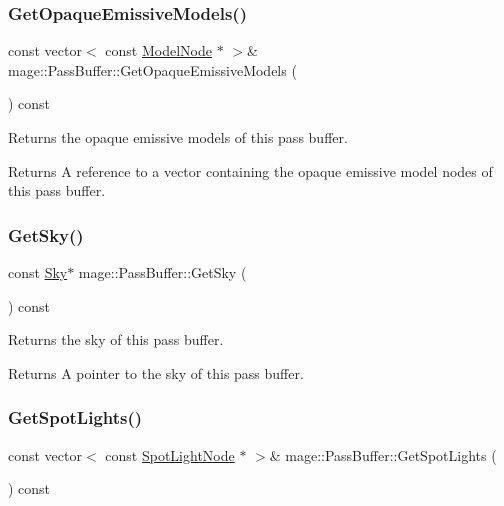 \subsubsection{\texorpdfstring{Get\+Opaque\+Emissive\+Models()}{GetOpaqueEmissiveModels()}}
{\footnotesize\ttfamily const vector$<$ const \hyperlink{classmage_1_1_model_node}{Model\+Node} $\ast$ $>$\& mage\+::\+Pass\+Buffer\+::\+Get\+Opaque\+Emissive\+Models (\begin{DoxyParamCaption}{ }\end{DoxyParamCaption}) const\hspace{0.3cm}{\ttfamily [noexcept]}}

Returns the opaque emissive models of this pass buffer.

\begin{DoxyReturn}{Returns}
A reference to a vector containing the opaque emissive model nodes of this pass buffer. 
\end{DoxyReturn}
\hypertarget{structmage_1_1_pass_buffer_af6355cb9bd927f53bb93347348f21a11}{}\label{structmage_1_1_pass_buffer_af6355cb9bd927f53bb93347348f21a11} 
\subsubsection{\texorpdfstring{Get\+Sky()}{GetSky()}}
{\footnotesize\ttfamily const \hyperlink{classmage_1_1_sky}{Sky}$\ast$ mage\+::\+Pass\+Buffer\+::\+Get\+Sky (\begin{DoxyParamCaption}{ }\end{DoxyParamCaption}) const\hspace{0.3cm}{\ttfamily [noexcept]}}

Returns the sky of this pass buffer.

\begin{DoxyReturn}{Returns}
A pointer to the sky of this pass buffer. 
\end{DoxyReturn}
\hypertarget{structmage_1_1_pass_buffer_a73b50abb85924fcd1f52239ab7e3ecda}{}\label{structmage_1_1_pass_buffer_a73b50abb85924fcd1f52239ab7e3ecda} 
\subsubsection{\texorpdfstring{Get\+Spot\+Lights()}{GetSpotLights()}}
{\footnotesize\ttfamily const vector$<$ const \hyperlink{namespacemage_aeed5dee4ff6c591eabb0e9114256df4a}{Spot\+Light\+Node} $\ast$ $>$\& mage\+::\+Pass\+Buffer\+::\+Get\+Spot\+Lights (\begin{DoxyParamCaption}{ }\end{DoxyParamCaption}) const\hspace{0.3cm}{\ttfamily [noexcept]}}

